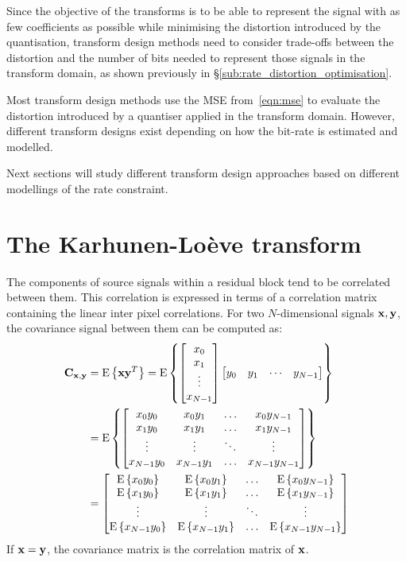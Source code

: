 \documentclass[11pt,a4paper,openright,twoside]{book}
\numberwithin{equation}{section} %
\numberwithin{figure}{section} %
\numberwithin{table}{section} %
\begin{document}
Since the objective of the transforms is to be able to represent the signal
with as few coefficients as possible while minimising the distortion
introduced by the quantisation, transform design methods need to consider
trade-offs between the distortion and the number of bits needed to represent
those signals in the transform domain, as shown previously in
\S\ref{sub:rate_distortion_optimisation}.

Most transform design methods use the \ac{MSE} from~\eqref{eqn:mse} to
evaluate the distortion introduced by a quantiser applied in the transform
domain.
However, different transform designs exist depending on how the bit-rate is
estimated and modelled.

Next sections will study different transform design approaches based on
different modellings of the rate constraint.
\section{The Karhunen-Loève transform}
\label{sec:the_karhunen_loeve_transform}
The components of source signals within a residual block tend to be correlated
between them.
This correlation is expressed in terms of a correlation matrix containing the
linear inter pixel correlations.
For two $N$-dimensional signals $\mathbf{x},\mathbf{y}$, the covariance signal between them
can be computed as:
\begin{align}
	\nonumber
	\mathbf{C}_{\mathbf{x},\mathbf{y}} & = \text{E}\left\{\mathbf{x}\mathbf{y}^T\right\} =
	\text{E}\left\{
	\begin{bmatrix}
		x_0 \\ x_1 \\ \vdots \\ x_{N-1}
	\end{bmatrix}
	\begin{bmatrix}
		y_0 & y_1 & \cdots & y_{N-1}
	\end{bmatrix}
	\right\} \\
	& = \text{E}\left\{
	\begin{bmatrix}
		x_0y_0 & x_0y_1 & \hdots & x_{0}y_{N-1} \\
		x_1y_0 & x_1y_1 & \hdots & x_{1}y_{N-1} \\
		\vdots & \vdots & \ddots & \vdots \\
		x_{N-1}y_0 & x_{N-1}y_1 & \hdots & x_{N-1}y_{N-1}
	\end{bmatrix}
	\right\} \\ \nonumber
	& =
	\begin{bmatrix}
		\text{E}\left\{x_0y_0\right\} & \text{E}\left\{x_0y_1\right\} & \hdots & \text{E}\left\{x_{0}y_{N-1}\right\} \\
		\text{E}\left\{x_1y_0\right\} & \text{E}\left\{x_1y_1\right\} & \hdots & \text{E}\left\{x_{1}y_{N-1}\right\} \\
		\vdots & \vdots & \ddots & \vdots \\
		\text{E}\left\{x_{N-1}y_0\right\} & \text{E}\left\{x_{N-1}y_1\right\} & \hdots & \text{E}\left\{x_{N-1}y_{N-1}\right\}
	\end{bmatrix}
\end{align}
If $\mathbf{x}=\mathbf{y}$, the covariance matrix is the correlation matrix of $\mathbf{x}$.
\end{document}
